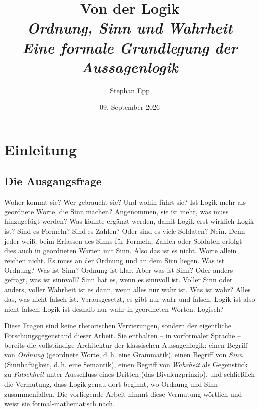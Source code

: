 \documentclass[12pt, a4paper]{article}
\title{\textbf{Von der Logik}\\[0.5em]
  {\Large\itshape Ordnung, Sinn und Wahrheit\\Eine formale Grundlegung der Aussagenlogik}}
\author{Stephan Epp}
\date{09. September 2026}
\theoremstyle{definition}
\theoremstyle{remark}
\begin{document}

\maketitle
\tableofcontents
\newpage

\section{Einleitung}
\label{sec:einleitung}

\subsection{Die Ausgangsfrage}
\label{subsec:ausgangsfrage}

Woher kommt sie? Wer gebraucht sie? Und wohin führt sie? Ist Logik mehr als geordnete Worte, die Sinn machen? Angenommen, sie ist mehr, was muss hinzugefügt werden? Was könnte ergänzt werden, damit Logik erst wirklich Logik ist? Sind es Formeln? Sind es Zahlen? Oder sind es viele Soldaten? Nein. Denn jeder weiß, beim Erfassen des Sinns für Formeln, Zahlen oder Soldaten erfolgt dies auch in geordneten Worten mit Sinn. Also das ist es nicht. Worte allein reichen nicht. Es muss an der Ordnung und an dem Sinn liegen. Was ist Ordnung? Was ist Sinn? Ordnung ist klar. Aber was ist Sinn? Oder anders gefragt, was ist sinnvoll? Sinn hat es, wenn es sinnvoll ist. Voller Sinn oder anders, voller Wahrheit ist es dann, wenn alles nur wahr ist. Was ist wahr? Alles das, was nicht falsch ist. Vorausgesetzt, es gibt nur wahr und falsch. Logik ist also nicht falsch. Logik ist deshalb nur wahr in geordneten Worten. Logisch?

Diese Fragen sind keine rhetorischen Verzierungen, sondern der eigentliche Forschungsgegenstand dieser Arbeit. Sie enthalten -- in vorformaler Sprache -- bereits die vollständige Architektur der klassischen Aussagenlogik: einen Begriff von \emph{Ordnung} (geordnete Worte, d.\,h. eine Grammatik), einen Begriff von \emph{Sinn} (Sinnhaftigkeit, d.\,h. eine Semantik), einen Begriff von \emph{Wahrheit} als Gegenstück zu \emph{Falschheit} unter Ausschluss eines Dritten (das Bivalenzprinzip), und schließlich die Vermutung, dass Logik genau dort beginnt, wo Ordnung und Sinn zusammenfallen. Die vorliegende Arbeit nimmt diese Vermutung wörtlich und weist sie formal-mathematisch nach.
\end{document}

